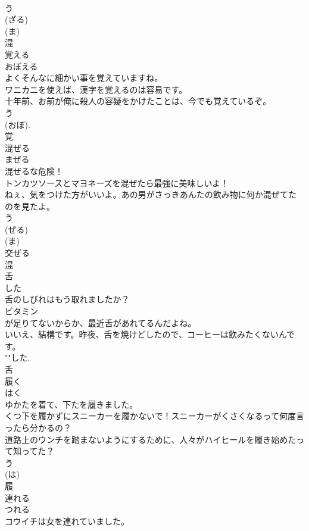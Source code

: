 \documentclass[8pt]{extreport}
\begin{document}
\begin{CJK}{UTF8}{min}
\\	う 
\\	(ざる) 
\\	(ま) 
\\	混	
\\	覚える	
\\	おぼえる	
\\	よくそんなに細かい事を覚えていますね。	
\\	ワニカニを使えば、漢字を覚えるのは容易です。	
\\	十年前、お前が俺に殺人の容疑をかけたことは、今でも覚えているぞ。	
\\	う 
\\	(おぼ). 
\\	覚	
\\	混ぜる	
\\	まぜる	
\\	混ぜるな危険！	
\\	トンカツソースとマヨネーズを混ぜたら最強に美味しいよ！	
\\	ねぇ、気をつけた方がいいよ。あの男がさっきあんたの飲み物に何か混ぜてたのを見たよ。	
\\	う 
\\	(ぜる) 
\\	(ま) 
\\	交ぜる 
\\	混	
\\	舌	
\\	した	
\\	舌のしびれはもう取れましたか？	
\\	ビタミン
\\	が足りてないからか、最近舌があれてるんだよね。	
\\	いいえ、結構です。昨夜、舌を焼けどしたので、コーヒーは飲みたくないんです。	
\\	""した.
\\	舌	
\\	履く	
\\	はく	
\\	ゆかたを着て、下たを履きました。	
\\	くつ下を履かずにスニーカーを履かないで！スニーカーがくさくなるって何度言ったら分かるの？	
\\	道路上のウンチを踏まないようにするために、人々がハイヒールを履き始めたって知ってた？	
\\	う 
\\	(は) 
\\	履	
\\	連れる	
\\	つれる	
\\	コウイチは女を連れていました。	

\end{CJK}
\end{document}
